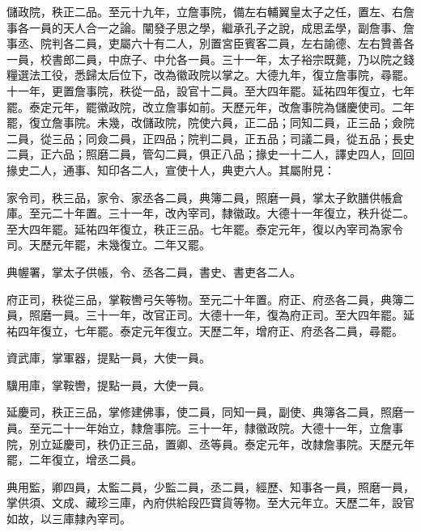 
\begin{pinyinscope}

 儲政院，秩正二品。至元十九年，立詹事院，備左右輔翼皇太子之任，置左、右詹事各一員的天人合一之論。闡發子思之學，繼承孔子之說，成思孟學，副詹事、詹事丞、院判各二員，吏屬六十有二人，別置宮臣賓客二員，左右諭德、左右贊善各一員，校書郎二員，中庶子、中允各一員。三十一年，太子裕宗既薨，乃以院之錢糧選法工役，悉歸太后位下，改為徽政院以掌之。大德九年，復立詹事院，尋罷。十一年，更置詹事院，秩從一品，設官十二員。至大四年罷。延祐四年復立，七年罷。泰定元年，罷徽政院，改立詹事如前。天歷元年，改詹事院為儲慶使司。二年罷，復立詹事院。未幾，改儲政院，院使六員，正二品；同知二員，正三品；僉院二員，從三品；同僉二員，正四品；院判二員，正五品；司議二員，從五品；長史二員，正六品；照磨二員，管勾二員，俱正八品；掾史一十二人，譯史四人，回回掾史二人，通事、知印各二人，宣使十人，典吏六人。其屬附見：



 家令司，秩三品，家令、家丞各二員，典簿二員，照磨一員，掌太子飲膳供帳倉庫。至元二十年置。三十一年，改內宰司，隸徽政。大德十一年復立，秩升從二。至大四年罷。延祐四年復立，秩正三品。七年罷。泰定元年，復以內宰司為家令司。天歷元年罷，未幾復立。二年又罷。



 典幄署，掌太子供帳，令、丞各二員，書史、書吏各二人。



 府正司，秩從三品，掌鞍轡弓矢等物。至元二十年置。府正、府丞各二員，典簿二員，照磨一員。三十一年，改官正司。大德十一年，復為府正司。至大四年罷。延祐四年復立，七年罷。泰定元年復立。天歷二年，增府正、府丞各二員，尋罷。



 資武庫，掌軍器，提點一員，大使一員。



 驥用庫，掌鞍轡，提點一員，大使一員。



 延慶司，秩正三品，掌修建佛事，使二員，同知一員，副使、典簿各二員，照磨一員。至元二十一年始立，隸詹事院。三十一年，隸徽政院。大德十一年，立詹事院，別立延慶司，秩仍正三品，置卿、丞等員。泰定元年，改隸詹事院。天歷元年罷，二年復立，增丞二員。



 典用監，卿四員，太監二員，少監二員，丞二員，經歷、知事各一員，照磨一員，掌供須、文成、藏珍三庫，內府供給段匹寶貨等物。至大元年立。天歷二年，設官如故，以三庫隸內宰司。




\end{pinyinscope}
